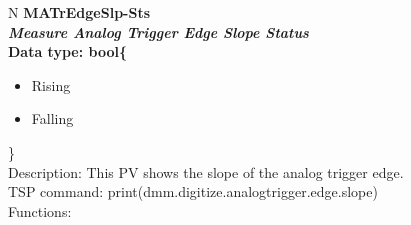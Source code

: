 \documentclass[openany]{article}
\begin{document}
		\begin{tabular}{N}
			\hline
			\bfseries MATrEdgeSlp-Sts\label{pv:matredgeslp-sts} \\ \hline
			\emph{Measure Analog Trigger Edge Slope Status} \\
			Data type: bool\{\begin{itemize}[noitemsep]
				\small
				\item[] Rising
				\item[] Falling
			\end{itemize}\} \\
			Description: This PV shows the slope of the analog trigger edge. \\
			TSP command: print(dmm.digitize.analogtrigger.edge.slope) \\
			Functions: \\
			\arrayrulecolor{\FuncTableBorderColor}

		\end{tabular}
\end{document}
